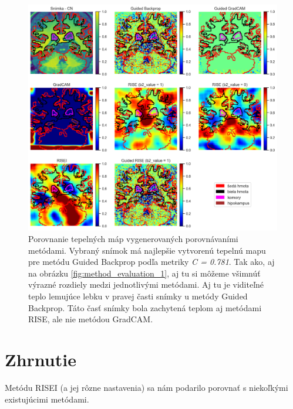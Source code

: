 \begin{figure}[h!]
    \centering
    \includegraphics[width=13cm]{assets/images/method_evaluation_2.png}
    \caption{Porovnanie tepelných máp vygenerovaných porovnávaními metódami. Vybraný snímok má najlepšie vytvorenú tepelnú mapu pre metódu Guided Backprop podľa metriky \textit{C = 0.781}. Tak ako, aj na obrázku \ref{fig:method_evaluation_1}, aj tu si môžeme všimnúť výrazné rozdiely medzi jednotlivými metódami. Aj tu je viditeľné teplo lemujúce lebku v pravej časti snímky u metódy Guided Backprop. Táto časť snímky bola zachytená teplom aj metódami RISE, ale nie metódou GradCAM.}
    \label{fig:method_evaluation_2}   
\end{figure}


\section{Zhrnutie}

Metódu RISEI (a jej rôzne nastavenia) sa nám podarilo porovnať s niekoľkými existujúcimi metódami.



